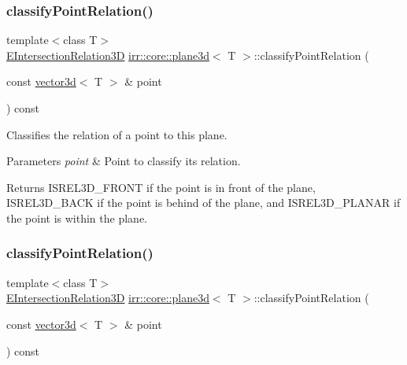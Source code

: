 \subsubsection{\texorpdfstring{classify\+Point\+Relation()}{classifyPointRelation()}\hspace{0.1cm}{\footnotesize\ttfamily [1/2]}}
{\footnotesize\ttfamily template$<$class T$>$ \\
\hyperlink{namespaceirr_1_1core_a8a9999eb0d151083f48afe5f7d17a96c}{E\+Intersection\+Relation3D} \hyperlink{classirr_1_1core_1_1plane3d}{irr\+::core\+::plane3d}$<$ T $>$\+::classify\+Point\+Relation (\begin{DoxyParamCaption}\item[{const \hyperlink{classirr_1_1core_1_1vector3d}{vector3d}$<$ T $>$ \&}]{point }\end{DoxyParamCaption}) const\hspace{0.3cm}{\ttfamily [inline]}}



Classifies the relation of a point to this plane. 


\begin{DoxyParams}{Parameters}
{\em point} & Point to classify its relation. \\
\hline
\end{DoxyParams}
\begin{DoxyReturn}{Returns}
I\+S\+R\+E\+L3\+D\+\_\+\+F\+R\+O\+NT if the point is in front of the plane, I\+S\+R\+E\+L3\+D\+\_\+\+B\+A\+CK if the point is behind of the plane, and I\+S\+R\+E\+L3\+D\+\_\+\+P\+L\+A\+N\+AR if the point is within the plane. 
\end{DoxyReturn}
\mbox{\label{classirr_1_1core_1_1plane3d_a14ba310b0ed9d14ce575f1c783cbd9a5}} 
\subsubsection{\texorpdfstring{classify\+Point\+Relation()}{classifyPointRelation()}\hspace{0.1cm}{\footnotesize\ttfamily [2/2]}}
{\footnotesize\ttfamily template$<$class T$>$ \\
\hyperlink{namespaceirr_1_1core_a8a9999eb0d151083f48afe5f7d17a96c}{E\+Intersection\+Relation3D} \hyperlink{classirr_1_1core_1_1plane3d}{irr\+::core\+::plane3d}$<$ T $>$\+::classify\+Point\+Relation (\begin{DoxyParamCaption}\item[{const \hyperlink{classirr_1_1core_1_1vector3d}{vector3d}$<$ T $>$ \&}]{point }\end{DoxyParamCaption}) const\hspace{0.3cm}{\ttfamily [inline]}}



